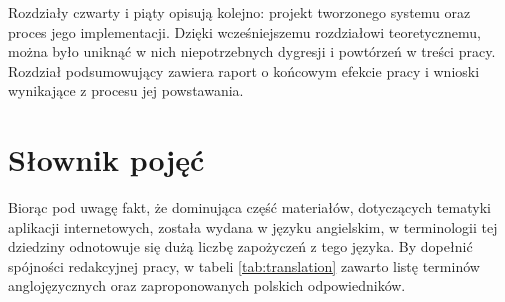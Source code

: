 Rozdziały czwarty i piąty opisują kolejno: projekt tworzonego systemu oraz proces jego implementacji. Dzięki wcześniejszemu rozdziałowi teoretycznemu, można było uniknąć w nich niepotrzebnych dygresji i powtórzeń w treści pracy. Rozdział podsumowujący zawiera raport o końcowym efekcie pracy i wnioski wynikające z procesu jej powstawania.

\section{Słownik pojęć}

Biorąc pod uwagę fakt, że dominująca część materiałów, dotyczących tematyki aplikacji internetowych, została wydana w języku angielskim, w terminologii tej dziedziny odnotowuje się dużą liczbę zapożyczeń z tego języka. By dopełnić spójności redakcyjnej pracy, w tabeli \ref{tab:translation} zawarto listę terminów anglojęzycznych oraz zaproponowanych polskich odpowiedników.

